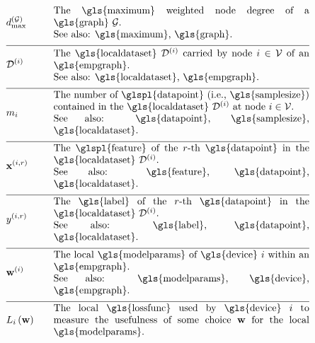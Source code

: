 \begin{align} 
	&\maxnodedegree^{(\graph)} & \quad & \parbox{.75\textwidth}{The \gls{maximum} weighted node degree of a \gls{graph} $\graph$.
		\\ See also: \gls{maximum}, \gls{graph}. } \nonumber \\[2mm] \hline \nonumber\\[-5mm] 
	&\localdataset{\nodeidx} & \quad & \parbox{.75\textwidth}{The \gls{localdataset} $\localdataset{\nodeidx}$ carried by 
		node $\nodeidx\in \nodes$ of an \gls{empgraph}.
		\\ See also: \gls{localdataset}, \gls{empgraph}. } \nonumber \\[2mm] \hline \nonumber\\[-5mm]
	&\localsamplesize{\nodeidx} & \quad & \parbox{.75\textwidth}{The number of \glspl{datapoint} (i.e., \gls{samplesize}) contained in the 
		\gls{localdataset} $\localdataset{\nodeidx}$ at node $\nodeidx\in \nodes$.
		\\ See also: \gls{datapoint}, \gls{samplesize}, \gls{localdataset}. } \nonumber \\[2mm] \hline \nonumber\\[-5mm]
	&\featurevec^{(\nodeidx,\sampleidx)} & \quad & \parbox{.75\textwidth}{The \glspl{feature} of the $\sampleidx$-th \gls{datapoint} in 
		the \gls{localdataset} $\localdataset{\nodeidx}$.
		\\ See also: \gls{feature}, \gls{datapoint}, \gls{localdataset}. } \nonumber \\[2mm] \hline \nonumber\\[-5mm]
	&\truelabel^{(\nodeidx,\sampleidx)} & \quad & \parbox{.75\textwidth}{The \gls{label} of the $\sampleidx$-th \gls{datapoint} in 
		the \gls{localdataset} $\localdataset{\nodeidx}$.
		\\ See also: \gls{label}, \gls{datapoint}, \gls{localdataset}. } \nonumber \\[2mm] \hline \nonumber\\[-5mm]
	&\localparams{\nodeidx} & \quad & \parbox{.75\textwidth}{The local \gls{modelparams} of \gls{device} $\nodeidx$ within an \gls{empgraph}.
		\\ See also: \gls{modelparams}, \gls{device}, \gls{empgraph}. } \nonumber \\[2mm] \hline \nonumber\\[-5mm]
	&\locallossfunc{\nodeidx}{\weights} & \quad & \parbox{.75\textwidth}{The local \gls{lossfunc} used by \gls{device} $\nodeidx$ 
		to measure the usefulness of some choice $\weights$ for the local \gls{modelparams}.
}
\end{align}
